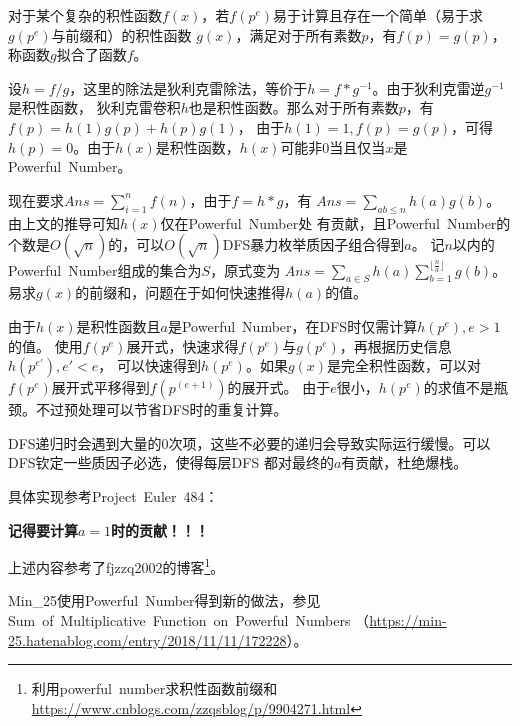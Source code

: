 对于某个复杂的积性函数$f(x)$，若$f(p^e)$易于计算且存在一个简单（易于求$g(p^e)$与前缀和）的积性函数
$g(x)$，满足对于所有素数$p$，有$f(p)=g(p)$，称函数$g$拟合了函数$f$。

设$h=f/g$，这里的除法是狄利克雷除法，等价于$h=f*g^{-1}$。由于狄利克雷逆$g^{-1}$是积性函数，
狄利克雷卷积$h$也是积性函数。那么对于所有素数$p$，有$f(p)=h(1)g(p)+h(p)g(1)$，
由于$h(1)=1,f(p)=g(p)$，可得$h(p)=0$。由于$h(x)$是积性函数，$h(x)$可能非0当且仅当$x$是
Powerful~Number。

现在要求$\displaystyle Ans=\sum_{i=1}^n{f(n)}$，由于$f=h*g$，有
$\displaystyle Ans=\sum_{ab\leq n}{h(a)g(b)}$。由上文的推导可知$h(x)$仅在Powerful~Number处
有贡献，且Powerful~Number的个数是$O(\sqrt{n})$的，可以$O(\sqrt{n})$DFS暴力枚举质因子组合得到$a$。
记$n$以内的Powerful~Number组成的集合为$S$，原式变为
$\displaystyle Ans=\sum_{a\in S}{h(a)\sum_{b=1}^{\lfloor \frac{n}{a} \rfloor}{g(b)}}$。
易求$g(x)$的前缀和，问题在于如何快速推得$h(a)$的值。

由于$h(x)$是积性函数且$a$是Powerful~Number，在DFS时仅需计算$h(p^e),e>1$的值。
使用$f(p^e)$展开式，快速求得$f(p^e)$与$g(p^e)$，再根据历史信息$h(p^{e'}),e'<e$，
可以快速得到$h(p^e)$。如果$g(x)$是完全积性函数，可以对$f(p^e)$展开式平移得到$f(p^(e+1))$的展开式。
由于$e$很小，$h(p^e)$的求值不是瓶颈。不过预处理可以节省DFS时的重复计算。

DFS递归时会遇到大量的0次项，这些不必要的递归会导致实际运行缓慢。可以DFS钦定一些质因子必选，使得每层DFS
都对最终的$a$有贡献，杜绝爆栈。

具体实现参考Project~Euler~484：


{\bfseries 记得要计算$a=1$时的贡献！！！}

上述内容参考了fjzzq2002的博客\footnote{
利用powerful~number求积性函数前缀和
    \url{https://www.cnblogs.com/zzqsblog/p/9904271.html}
}。

Min\_25使用Powerful~Number得到新的做法，参见
Sum~of~Multiplicative~Function~on~Powerful~Numbers
（\url{https://min-25.hatenablog.com/entry/2018/11/11/172228}）。
